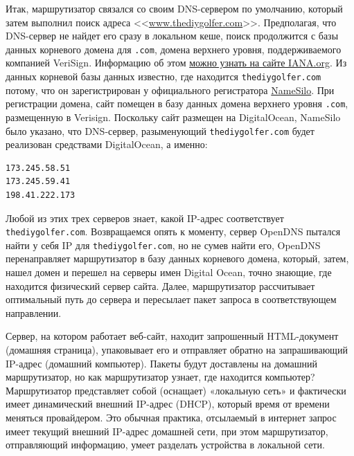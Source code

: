 \documentclass[a4paper,12pt,final,openany]{extbook}
\begin{document}
Итак, маршрутизатор связался со своим DNS-сервером по умолчанию, который затем
выполнил поиск адреса
<<\href{http://www.thediygolfer.com}{www.thediygolfer.com}>>.
Предполагая, что DNS-сервер не найдет его сразу в локальном кеше, поиск продолжится с
базы данных корневого домена для \texttt{.com}, домена верхнего уровня,
поддерживаемого компанией VeriSign. Информацию об этом
\href{https://www.iana.org/domains/root/db/com.html}{можно узнать на сайте
IANA.org}. Из данных корневой базы данных известно, где находится
\texttt{thediygolfer.com} потому, что он зарегистрирован у официального
регистратора
\href{https://www.namesilo.com/register.php?rid=21c9e40dd}{NameSilo}.
При регистрации домена, сайт помещен в базу данных домена верхнего
уровня \texttt{.com}, размещенную в Verisign. Поскольку сайт размещен на
DigitalOcean, NameSilo было указано, что DNS-сервер, разыменующий \texttt{thediygolfer.com} будет реализован средствами DigitalOcean, а именно:
\begin{verbatim}
173.245.58.51
173.245.59.41
198.41.222.173
\end{verbatim}

Любой из этих трех серверов знает, какой IP-адрес соответствует
\texttt{thediygolfer.com}. Возвращаемся опять к моменту,
сервер OpenDNS пытался найти у себя IP для \texttt{thediygolfer.com}, но не
сумев найти его, OpenDNS перенаправляет маршрутизатор в базу данных
корневого домена, который, затем, нашел домен и перешел на серверы имен
Digital Ocean, точно знающие, где находится физический сервер сайта.
Далее, маршрутизатор рассчитывает оптимальный путь до сервера и пересылает пакет
запроса в соответствующем направлении.

Сервер, на котором работает веб-сайт, находит
запрошенный HTML-документ (домашняя страница), упаковывает его и отправляет
обратно на запрашивающий IP-адрес (домашний компьютер). Пакеты будут
доставлены на домашний маршрутизатор, но как маршрутизатор узнает, где
находится компьютер?
Маршрутизатор представляет собой (оснащает) «локальную сеть» и фактически имеет
динамический внешний IP-адрес (DHCP), который время от времени меняться
провайдером. Это обычная практика, отсылаемый в интернет запрос имеет текущий внешний
IP-адрес домашней сети, при этом маршрутизатор, отправляющий информацию,
умеет разделать устройства в локальной сети.
\end{document}
